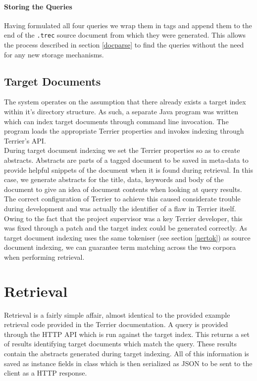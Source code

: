 \documentclass{l4proj}
\newcommand{\code}[1]{\texttt{#1}}
\begin{document}
\paragraph{Storing the Queries}
Having formulated all four queries we wrap them in tags and append them to the end of the \code{.trec} source document from which they were generated. This allows the process described in section \ref{docparse} to find the queries without the need for any new storage mechanisms.

\subsection{Target Documents}
The system operates on the assumption that there already exists a target index within it's directory structure.
As such, a separate Java program was written which can index target documents through command line invocation. The program loads the appropriate Terrier properties and invokes indexing through Terrier's API. \\ During target document indexing we set the Terrier properties so as to create abstracts. Abstracts are parts of a tagged document to be saved in meta-data to provide helpful snippets of the document when it is found during retrieval. In this case, we generate abstracts for the title, data, keywords and body of the document to give an idea of document contents when looking at query results.
The correct configuration of Terrier to achieve this caused considerate trouble during development and was actually the identifier of a flaw in Terrier itself. Owing to the fact that the project supervisor was a key Terrier developer, this was fixed through a patch and the target index could be generated correctly.
As target document indexing uses the same tokeniser (see section \ref{nertok}) as source document indexing, we can guarantee term matching across the two corpora when performing retrieval.

\section{Retrieval}
Retrieval is a fairly simple affair, almost identical to the provided example retrieval code provided in the Terrier documentation.
A query is provided through the HTTP API which is run against the target index. This returns a set of results identifying target documents which match the query. These results contain the abstracts generated during target indexing. All of this information is saved as instance fields in class which is then serialized as JSON to be sent to the client as a HTTP response.
\end{document}
